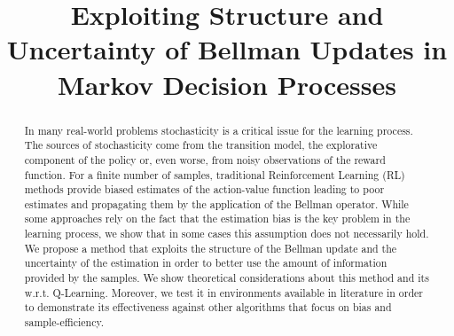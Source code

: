 \documentclass[conference]{IEEEtran}
\begin{document}
\title{Exploiting Structure and Uncertainty of Bellman Updates in Markov Decision Processes}

\author{
}

\maketitle

\begin{abstract}
In many real-world problems stochasticity is a critical issue for the learning process. The sources of stochasticity come from the transition model, the explorative component of the policy or, even worse, from noisy observations of the reward function. For a finite number of samples, traditional Reinforcement Learning (RL) methods provide biased estimates of the action-value function leading to poor estimates and propagating them by the application of the Bellman operator. While some approaches rely on the fact that the estimation bias is the key problem in the learning process, we show that in some cases this assumption does not necessarily hold. We propose a method that exploits the structure of the Bellman update and the uncertainty of the estimation in order to better use the amount of information provided by the samples. We show theoretical considerations about this method and its w.r.t. Q-Learning. Moreover, we test it in environments available in literature in order to demonstrate its effectiveness against other algorithms that focus on bias and sample-efficiency.
\end{abstract}



%
\IEEEpeerreviewmaketitle
\end{document}

